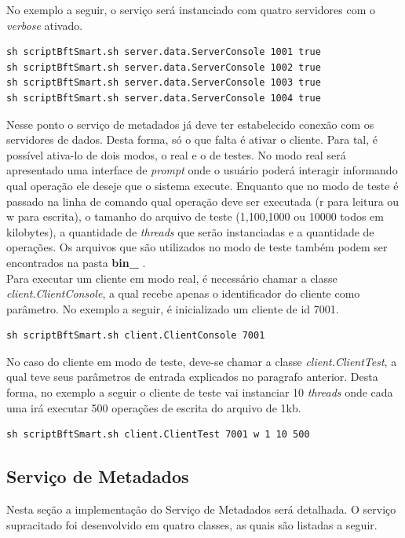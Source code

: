 No exemplo a seguir, o serviço será instanciado com quatro servidores com o \textit{verbose} ativado.

\begin{lstlisting}
sh scriptBftSmart.sh server.data.ServerConsole 1001 true
sh scriptBftSmart.sh server.data.ServerConsole 1002 true
sh scriptBftSmart.sh server.data.ServerConsole 1003 true
sh scriptBftSmart.sh server.data.ServerConsole 1004 true
\end{lstlisting}

Nesse ponto o serviço de metadados já deve ter estabelecido conexão com os servidores de dados. Desta forma, só o que falta é ativar o cliente. Para tal, é possível ativa-lo de dois modos, o real e o de testes. No modo real será apresentado uma interface de \textit{prompt} onde o usuário poderá interagir informando qual operação ele deseje que o sistema execute. Enquanto que no modo de teste é passado na linha de comando qual operação deve ser executada (r para leitura ou w para escrita), o tamanho do arquivo de teste (1,100,1000 ou 10000 todos em kilobytes), a quantidade de \textit{threads} que serão instanciadas e a quantidade de operações. Os arquivos que são utilizados no modo de teste também podem ser encontrados na pasta \textbf{bin\_ }.
\\

Para executar um cliente em modo real, é necessário chamar a classe \textit{client.ClientConsole}, a qual recebe apenas o identificador do cliente como parâmetro. No exemplo a seguir, é inicializado um cliente de id 7001.
\\

\begin{lstlisting}
sh scriptBftSmart.sh client.ClientConsole 7001
\end{lstlisting}

No caso do cliente em modo de teste, deve-se chamar a classe \textit{client.ClientTest}, a qual teve seus parâmetros de entrada explicados no paragrafo anterior. Desta forma, no exemplo a seguir o cliente de teste vai instanciar 10 \textit{threads} onde cada uma irá executar 500 operações de escrita do arquivo de 1kb.

\begin{lstlisting}
sh scriptBftSmart.sh client.ClientTest 7001 w 1 10 500
\end{lstlisting}
	
\subsection{Serviço de Metadados}
Nesta seção a implementação do Serviço de Metadados será detalhada. O serviço supracitado foi desenvolvido em quatro classes, as quais são listadas a seguir.
\\

